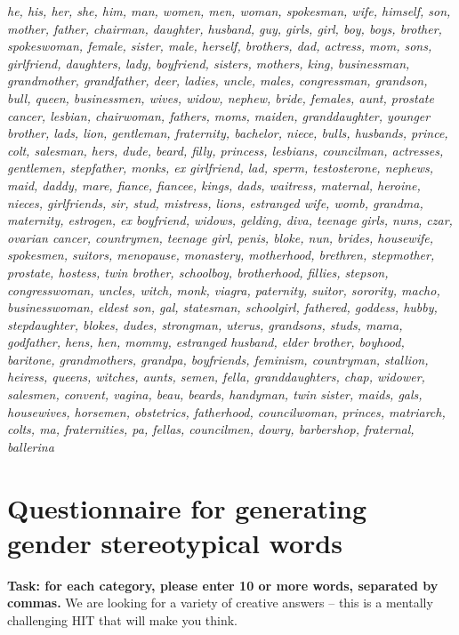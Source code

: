 \documentclass{article}
\begin{document}
{\em he, his, her, she, him, man, women, men, woman, spokesman, wife, himself, son, mother, father, chairman, daughter, husband, guy, girls, girl, boy, boys, brother, spokeswoman, female, sister, male, herself, brothers, dad, actress, mom, sons, girlfriend, daughters, lady, boyfriend, sisters, mothers, king, businessman, grandmother, grandfather, deer, ladies, uncle, males, congressman, grandson, bull, queen, businessmen, wives, widow, nephew, bride, females, aunt, prostate cancer, lesbian, chairwoman, fathers, moms, maiden, granddaughter, younger brother, lads, lion, gentleman, fraternity, bachelor, niece, bulls, husbands, prince, colt, salesman, hers, dude, beard, filly, princess, lesbians, councilman, actresses, gentlemen, stepfather, monks, ex girlfriend, lad, sperm, testosterone, nephews, maid, daddy, mare, fiance, fiancee, kings, dads, waitress, maternal, heroine, nieces, girlfriends, sir, stud, mistress, lions, estranged wife, womb, grandma, maternity, estrogen, ex boyfriend, widows, gelding, diva, teenage girls, nuns, czar, ovarian cancer, countrymen, teenage girl, penis, bloke, nun, brides, housewife, spokesmen, suitors, menopause, monastery, motherhood, brethren, stepmother, prostate, hostess, twin brother, schoolboy, brotherhood, fillies, stepson, congresswoman, uncles, witch, monk, viagra, paternity, suitor, sorority, macho, businesswoman, eldest son, gal, statesman, schoolgirl, fathered, goddess, hubby, stepdaughter, blokes, dudes, strongman, uterus, grandsons, studs, mama, godfather, hens, hen, mommy, estranged husband, elder brother, boyhood, baritone, grandmothers, grandpa, boyfriends, feminism, countryman, stallion, heiress, queens, witches, aunts, semen, fella, granddaughters, chap, widower, salesmen, convent, vagina, beau, beards, handyman, twin sister, maids, gals, housewives, horsemen, obstetrics, fatherhood, councilwoman, princes, matriarch, colts, ma, fraternities, pa, fellas, councilmen, dowry, barbershop, fraternal, ballerina}



\section {Questionnaire for generating gender stereotypical words}


\textbf{Task: for each category, please enter 10 or more words, separated by commas.} 
We are looking for a variety of creative answers -- this is a mentally challenging HIT that will make you think.
\end{document}
